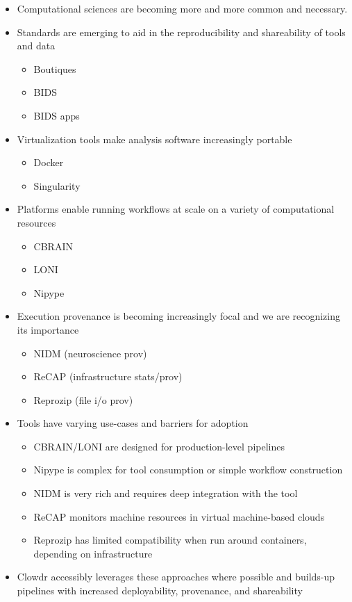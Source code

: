 \documentclass[9pt,twocolumn,twoside]{pnas-new}
\begin{document}
\begin{itemize}
\item Computational sciences are becoming more and more common and necessary.
\item Standards are emerging to aid in the reproducibility and shareability of tools and data
\begin{itemize}
\item Boutiques
\item BIDS
\item BIDS apps
\end{itemize}
\item Virtualization tools make analysis software increasingly portable
\begin{itemize}
\item Docker
\item Singularity
\end{itemize}
\item Platforms enable running workflows at scale on a variety of computational resources
\begin{itemize}
\item CBRAIN
\item LONI
\item Nipype
\end{itemize}
\item Execution provenance is becoming increasingly focal and we are recognizing its importance
\begin{itemize}
\item NIDM (neuroscience prov)
\item ReCAP (infrastructure stats/prov)
\item Reprozip (file i/o prov)
\end{itemize}
\item Tools have varying use-cases and barriers for adoption
\begin{itemize}
\item CBRAIN/LONI are designed for production-level pipelines
\item Nipype is complex for tool consumption or simple workflow construction
\item NIDM is very rich and requires deep integration with the tool
\item ReCAP monitors machine resources in virtual machine-based clouds
\item Reprozip has limited compatibility when run around containers, depending on infrastructure
\end{itemize}
\item Clowdr accessibly leverages these approaches where possible and builds-up pipelines with increased deployability, provenance, and shareability

\end{itemize}
\end{document}
